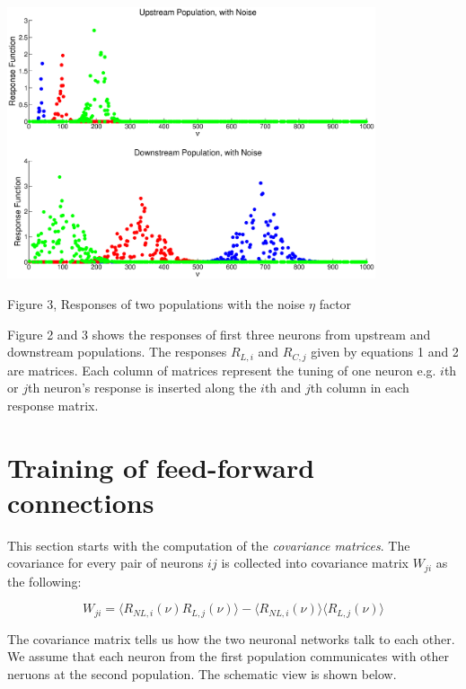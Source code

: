 \documentclass{article}
\begin{document}
\begin{center}
\includegraphics[width=\textwidth,height=80mm]{f2.eps}
\begin{footnotesize}
 Figure 3, Responses of two populations with the noise $\eta$ factor
\end{footnotesize}
\end{center}

Figure 2 and 3 shows the responses of first three neurons from upstream and downstream populations. The responses $R_{L,i}$ and $R_{C,j}$ given by equations 1 and 2 are matrices. Each column of matrices represent the tuning of one neuron e.g. $i$th or $j$th neuron's response is inserted along the $i$th and $j$th column in each response matrix.  

\section{Training of feed-forward connections}
This section starts with the computation of the \textit{covariance matrices}. The covariance for every pair of neurons $ij$ is collected into covariance matrix $W_{ji}$ as the following:

\begin{equation}
 W_{ji}=\langle R_{NL,i} (\nu) R_{L,j}(\nu) \rangle - \langle R_{NL,i}(\nu)\rangle \langle R_{L,j}(\nu) \rangle
\end{equation}

The covariance matrix tells us how the two neuronal networks talk to each other. We assume that each neuron from the first population communicates with other neruons at the second population. The schematic view is shown below.
\end{document}
